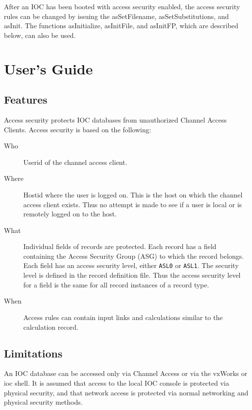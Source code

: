 After an IOC has been booted with access security enabled, the access security rules can be changed by issuing the 
asSetFilename, asSetSubstitutions, and asInit. The functions asInitialize, asInitFile, and asInitFP, which are described 
below, can also be used.

\section{User's Guide}

\subsection{Features}

Access security protects IOC databases from unauthorized Channel Access Clients.
Access security is based on the following:

\begin{description}
\item [Who] Userid of the channel access client.

\item [Where] Hostid where the user is logged on.
This is the host on which the channel access client exists.
Thus no attempt is made to see if a user is local or is remotely logged on to the host.

\item [What] Individual fields of records are protected.
Each record has a field containing the Access Security Group (ASG) to which the record belongs.
Each field has an access security level, either \verb|ASL0| or \verb|ASL1|.
The security level is defined in the record definition file.
Thus the access security level for a field is the same for all record instances of a record type.

\item [When] Access rules can contain input links and calculations similar to the calculation record. 
\end{description}

\subsection{Limitations}

An IOC database can be accessed only via Channel Access or via the vxWorks or ioc shell.
It is assumed that access to the local IOC console is protected via physical security, and that network access is protected via normal networking and 
physical security methods.

